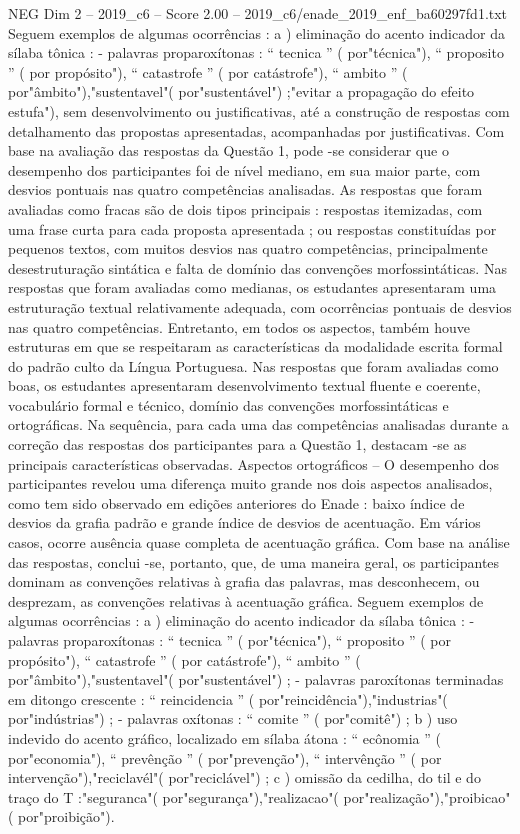 \begin{textsample}{NEG Dim 2 – 2019\_c6 – Score 2.00 – 2019\_c6/enade\_2019\_enf\_ba60297fd1.txt}
Seguem exemplos de algumas ocorrências : a ) eliminação do acento indicador da sílaba tônica : - palavras proparoxítonas : “ tecnica ” ( por"técnica"), “ proposito ” ( por propósito"), “ catastrofe ” ( por catástrofe"), “ ambito ” ( por"âmbito"),"sustentavel"( por"sustentável") ;"evitar a propagação do efeito estufa"), sem desenvolvimento ou justificativas, até a construção de respostas com detalhamento das propostas apresentadas, acompanhadas por justificativas.
Com base na avaliação das respostas da Questão 1, pode -se considerar que o desempenho dos participantes foi de nível mediano, em sua maior parte, com desvios pontuais nas quatro competências analisadas.
As respostas que foram avaliadas como fracas são de dois tipos principais : respostas itemizadas, com uma frase curta para cada proposta apresentada ; ou respostas constituídas por pequenos textos, com muitos desvios nas quatro competências, principalmente desestruturação sintática e falta de domínio das convenções morfossintáticas.
Nas respostas que foram avaliadas como medianas, os estudantes apresentaram uma estruturação textual relativamente adequada, com ocorrências pontuais de desvios nas quatro competências.
Entretanto, em todos os aspectos, também houve estruturas em que se respeitaram as características da modalidade escrita formal do padrão culto da Língua Portuguesa.
Nas respostas que foram avaliadas como boas, os estudantes apresentaram desenvolvimento textual fluente e coerente, vocabulário formal e técnico, domínio das convenções morfossintáticas e ortográficas.
Na sequência, para cada uma das competências analisadas durante a correção das respostas dos participantes para a Questão 1, destacam -se as principais características observadas.
Aspectos ortográficos – O desempenho dos participantes revelou uma diferença muito grande nos dois aspectos analisados, como tem sido observado em edições anteriores do Enade : baixo índice de desvios da grafia padrão e grande índice de desvios de acentuação.
Em vários casos, ocorre ausência quase completa de acentuação gráfica.
Com base na análise das respostas, conclui -se, portanto, que, de uma maneira geral, os participantes dominam as convenções relativas à grafia das palavras, mas desconhecem, ou desprezam, as convenções relativas à acentuação gráfica.
Seguem exemplos de algumas ocorrências : a ) eliminação do acento indicador da sílaba tônica : - palavras proparoxítonas : “ tecnica ” ( por"técnica"), “ proposito ” ( por propósito"), “ catastrofe ” ( por catástrofe"), “ ambito ” ( por"âmbito"),"sustentavel"( por"sustentável") ; - palavras paroxítonas terminadas em ditongo crescente : “ reincidencia ” ( por"reincidência"),"industrias"( por"indústrias") ; - palavras oxítonas : “ comite ” ( por"comitê") ; b ) uso indevido do acento gráfico, localizado em sílaba átona : “ ecônomia ” ( por"economia"), “ prevênção ” ( por"prevenção"), “ intervênção ” ( por intervenção"),"reciclavél"( por"reciclável") ; c ) omissão da cedilha, do til e do traço do T :"seguranca"( por"segurança"),"realizacao"( por"realização"),"proibicao"( por"proibição").

\end{textsample}
